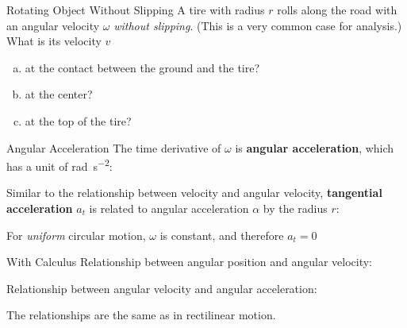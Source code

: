 \documentclass[12pt,compress,aspectratio=169]{beamer}
\begin{document}
\begin{frame}{Rotating Object Without Slipping}
  A tire with radius $r$ rolls along the road with an angular velocity $\omega$
  \emph{without slipping}. (This is a very common case for analysis.)  What
  is its velocity $v$
  \begin{enumerate}[a.]
  \item at the contact between the ground and the tire?
  \item at the center?
  \item at the top of the tire?
  \end{enumerate}

  \vspace{-.4in}
  \begin{center}
    \hspace{1in}
  \end{center}
\end{frame}



\begin{frame}{Angular Acceleration}
  The time derivative of $\omega$ is \textbf{angular acceleration}, which
  has a unit of \si{\radian\per\second\squared}:


  Similar to the relationship between velocity and angular velocity,
  \textbf{tangential acceleration} $a_t$ is related to angular acceleration
  $\alpha$ by the radius $r$:
    
    
  For \emph{uniform} circular motion, $\omega$ is constant, and therefore
  $a_t=0$
\end{frame}



\begin{frame}{With Calculus}
  Relationship between angular position and angular velocity:


  Relationship between angular velocity and angular acceleration:


  The relationships are the same as in rectilinear motion.
\end{frame}
\end{document}

